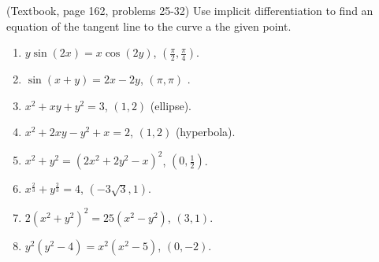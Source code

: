 \begin{problem}(Textbook, page 162, problems 25-32) Use implicit differentiation to find an equation of the tangent line to the curve a the given point.
\begin{multicols}{3}
\begin{enumerate}
\item $y\sin (2x)=x\cos (2y) $, $\left(\frac{\pi}{2}, \frac{\pi}{4}\right)$. 
\item $ \sin (x+y)=2x-2y$, $(\pi,\pi)$ . 
\item $x^2+x y+y^2=3 $, $(1,2)$ (ellipse). 
\item $x^2+2x y-y^2+x=2 $, $(1,2)$ (hyperbola). 
\item $x^2+y^2=(2x^2+2y^2-x)^2 $, $(0,\frac{1}{2})$. 
\item $x^{\frac{2}{3}}+y^{\frac{2}{3}}=4$, $(-3\sqrt{3},1)$. 
\item $2(x^2+y^2)^2 =25(x^2-y^2)$, $(3,1)$. 
\item $y^2(y^2-4)=x^2(x^2-5) $, $(0,-2)$. 
\end{enumerate}
\end{multicols}
\end{problem}
